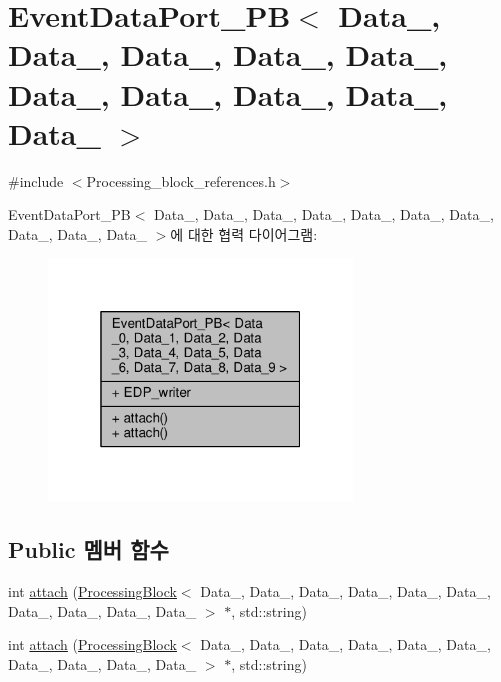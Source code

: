 \hypertarget{classEventDataPort__PB}{}\section{Event\+Data\+Port\+\_\+\+PB$<$ Data\+\_, Data\+\_, Data\+\_, Data\+\_, Data\+\_, Data\+\_, Data\+\_, Data\+\_, Data\+\_, Data\+\_ $>$}
\label{classEventDataPort__PB}


{\ttfamily \#include $<$Processing\+\_\+block\+\_\+references.\+h$>$}



Event\+Data\+Port\+\_\+\+PB$<$ Data\+\_, Data\+\_, Data\+\_, Data\+\_, Data\+\_, Data\+\_, Data\+\_, Data\+\_, Data\+\_, Data\+\_ $>$에 대한 협력 다이어그램\+:\nopagebreak
\begin{figure}[H]
\begin{center}
\leavevmode
\includegraphics[width=229pt]{classEventDataPort__PB__coll__graph}
\end{center}
\end{figure}
\subsection*{Public 멤버 함수}
\begin{DoxyCompactItemize}
\item 
int \hyperlink{classEventDataPort__PB_a9cf59d5a3d5b1963433965aa04550b5d}{attach} (\hyperlink{classProcessingBlock}{Processing\+Block}$<$ Data\+\_, Data\+\_, Data\+\_, Data\+\_, Data\+\_, Data\+\_, Data\+\_, Data\+\_, Data\+\_, Data\+\_ $>$ $\ast$, std\+::string)
\item 
int \hyperlink{classEventDataPort__PB_a9cf59d5a3d5b1963433965aa04550b5d}{attach} (\hyperlink{classProcessingBlock}{Processing\+Block}$<$ Data\+\_, Data\+\_, Data\+\_, Data\+\_, Data\+\_, Data\+\_, Data\+\_, Data\+\_, Data\+\_, Data\+\_ $>$ $\ast$, std\+::string)
\end{DoxyCompactItemize}
